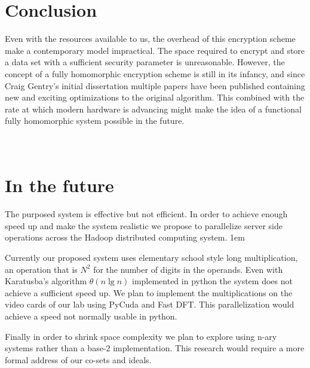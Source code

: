 \documentclass[letterpaper,11pt]{article} %
\begin{document}
\section*{Conclusion}

Even with the resources available to us, the overhead of this encryption scheme make a contemporary model impractical. The space required to encrypt and store a data set with a sufficient security parameter is unreasonable. However, the concept of a fully homomorphic encryption scheme is still in its infancy, and since Craig Gentry's initial dissertation multiple papers have been published containing new and exciting optimizations to the original algorithm. This combined with the rate at which modern hardware is advancing might make the idea of a functional fully homomorphic system possible in the future. \\ \\ \\

\section*{In the future}
\hspace{1em}The purposed system is effective but not efficient. In order to achieve enough speed up and make the system realistic we propose to parallelize server side operations across the Hadoop distributed computing system.
\parskip 1em

\hspace{1em}Currently our proposed system uses elementary school style long multiplication, an operation that is \(N^2\) for the number of digits in the operands. Even with Karatusba's algorithm \(\theta( n \lg n)\) implemented in python the system does not achieve a sufficient speed up. We plan to implement the multiplications on the video cards of our lab using PyCuda and Fast DFT. This parallelization would achieve a speed not normally usable in python.


\hspace{1em}Finally in order to shrink space complexity we plan to explore using n-ary systems rather than a base-2 implementation. This research would require a more formal address of our co-sets and ideals.
\end{document}
